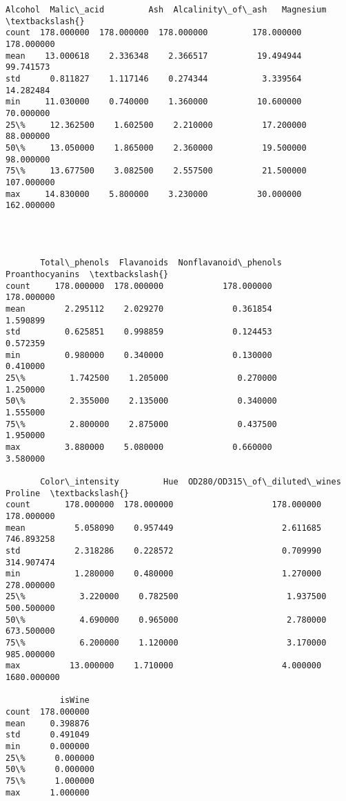 \documentclass[11pt]{article}
\makeatletter
\newcommand{\boxspacing}{\kern\kvtcb@left@rule\kern\kvtcb@boxsep}
\newcommand{\prompt}[4]{
        {\ttfamily\llap{{\color{#2}[#3]:\hspace{3pt}#4}}\vspace{-\baselineskip}}
    }
\makeatother
\begin{document}
            \begin{tcolorbox}[breakable, size=fbox, boxrule=.5pt, pad at break*=1mm, opacityfill=0]
\prompt{Out}{outcolor}{6}{\boxspacing}
\begin{Verbatim}[commandchars=\\\{\}]
          Alcohol  Malic\_acid         Ash  Alcalinity\_of\_ash   Magnesium  \textbackslash{}
count  178.000000  178.000000  178.000000         178.000000  178.000000
mean    13.000618    2.336348    2.366517          19.494944   99.741573
std      0.811827    1.117146    0.274344           3.339564   14.282484
min     11.030000    0.740000    1.360000          10.600000   70.000000
25\%     12.362500    1.602500    2.210000          17.200000   88.000000
50\%     13.050000    1.865000    2.360000          19.500000   98.000000
75\%     13.677500    3.082500    2.557500          21.500000  107.000000
max     14.830000    5.800000    3.230000          30.000000  162.000000




       Total\_phenols  Flavanoids  Nonflavanoid\_phenols  Proanthocyanins  \textbackslash{}
count     178.000000  178.000000            178.000000       178.000000
mean        2.295112    2.029270              0.361854         1.590899
std         0.625851    0.998859              0.124453         0.572359
min         0.980000    0.340000              0.130000         0.410000
25\%         1.742500    1.205000              0.270000         1.250000
50\%         2.355000    2.135000              0.340000         1.555000
75\%         2.800000    2.875000              0.437500         1.950000
max         3.880000    5.080000              0.660000         3.580000

       Color\_intensity         Hue  OD280/OD315\_of\_diluted\_wines      Proline  \textbackslash{}
count       178.000000  178.000000                    178.000000   178.000000
mean          5.058090    0.957449                      2.611685   746.893258
std           2.318286    0.228572                      0.709990   314.907474
min           1.280000    0.480000                      1.270000   278.000000
25\%           3.220000    0.782500                      1.937500   500.500000
50\%           4.690000    0.965000                      2.780000   673.500000
75\%           6.200000    1.120000                      3.170000   985.000000
max          13.000000    1.710000                      4.000000  1680.000000

           isWine
count  178.000000
mean     0.398876
std      0.491049
min      0.000000
25\%      0.000000
50\%      0.000000
75\%      1.000000
max      1.000000
\end{Verbatim}
\end{tcolorbox}
\end{document}
